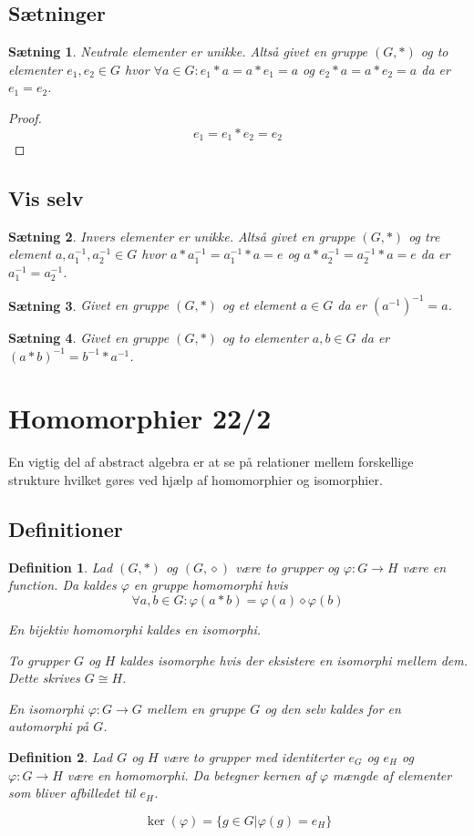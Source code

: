 \documentclass{article}
\newcommand{\inv}{^{-1}}
\newcommand{\too}{\rightarrow}
\newtheorem{setn}{Sætning}
\newtheorem{defi}{Definition}
\begin{document}
		\subsection*{Sætninger}
		\begin{setn}
			Neutrale elementer er unikke. Altså givet en gruppe $(G,*)$ og to elementer
			$e_1, e_2 \in G$ hvor $\forall a \in G: e_1*a=a*e_1=a$ og $e_2*a=a*e_2=a$
			da er $e_1 = e_2$.
		\end{setn}
		\begin{proof}
			$$e_1 = e_1*e_2 = e_2$$
		\end{proof}
		\subsection*{Vis selv}
		\begin{setn}
			Invers elementer er unikke. Altså givet en gruppe $(G,*)$ og tre element
			$a,a_1\inv,a_2\inv\in G$ hvor $a*a_1\inv=a_1\inv*a=e$ og $a*a_2\inv=a_2\inv*a=e$
			da er $a_1\inv = a_2\inv$.
		\end{setn}
		\begin{setn}
			Givet en gruppe $(G,*)$ og et element $a \in G$ da er $(a\inv)\inv = a$.
		\end{setn}
		\begin{setn}
			Givet en gruppe $(G,*)$ og to elementer $a,b \in G$ da er $(a*b)\inv=b\inv*a\inv$.
		\end{setn}
	\newpage
	\section*{Homomorphier 22/2}
		En vigtig del af abstract algebra er at se på relationer mellem
		forskellige strukture hvilket gøres ved hjælp af homomorphier og isomorphier.
		\subsection*{Definitioner}
		\begin{defi}
			Lad $(G,*)$ og $(G,\diamond)$ være to grupper og $\varphi: G \too H$ være
			en function. Da kaldes $\varphi$ en gruppe homomorphi hvis
			$$\forall a, b \in G: \varphi(a*b) = \varphi(a) \diamond \varphi(b)$$

			En bijektiv homomorphi kaldes en isomorphi.

			To grupper $G$ og $H$ kaldes isomorphe hvis der eksistere en isomorphi
			mellem dem. Dette skrives $G \cong H$.

			En isomorphi $\varphi: G \too G$ mellem en gruppe $G$ og den selv kaldes for en
			automorphi på $G$.
		\end{defi}
		\begin{defi}
			Lad $G$ og $H$ være to grupper med identiterter $e_G$ og $e_H$
			og $\varphi: G \too H$ være en homomorphi.
			Da betegner kernen af $\varphi$ mængde af elementer som bliver afbilledet til $e_H$.

			$$\ker(\varphi) = \{g \in G | \varphi(g) = e_H\}$$
		\end{defi}
\end{document}
